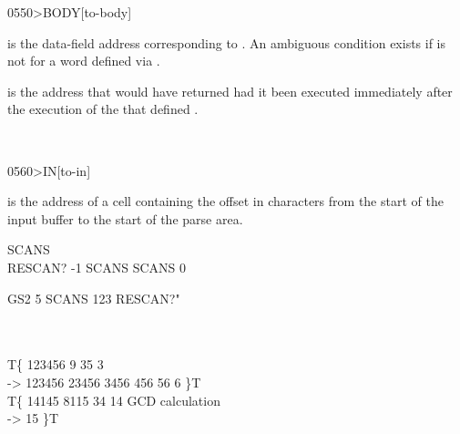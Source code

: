 \vspace*{-1ex}
\begin{worddef}[toBODY]{0550}{>BODY}[to-body]
\item {}

	 is the data-field address corresponding to
	. An ambiguous condition exists if  is not
	for a word defined via .


	\begin{rationale} %
		 is the address that  would have
		returned had it been executed immediately after the execution
		of the  that defined .
	\end{rationale}

	\begin{testing} %
		 \\
	\end{testing}
\end{worddef}

\vspace*{-1ex}
\begin{worddef}[toIN]{0560}{>IN}[to-in]
\item {}

	 is the address of a cell containing the offset in
	characters from the start of the input buffer to the start of
	the parse area.


	\begin{testing} %
		\ttfamily
		 SCANS \\
		\word{:} RESCAN?  -1 SCANS \word{+!} SCANS   0  \word{!}  \word{;}


		\word{:} GS2  5 SCANS \word{!}  123 RESCAN?"  \word{;} \\

		  \\
		 \\
		T\{ 123456   9  35  \word{+} 3 \word{+}  \word{!} \\
		-> 123456 23456 3456 456 56 6 \}T \\
		T\{ 14145 8115   34   \word{+!}   14  \word{!} GCD calculation \\
		-> 15 \}T
	\end{testing}
\end{worddef}


